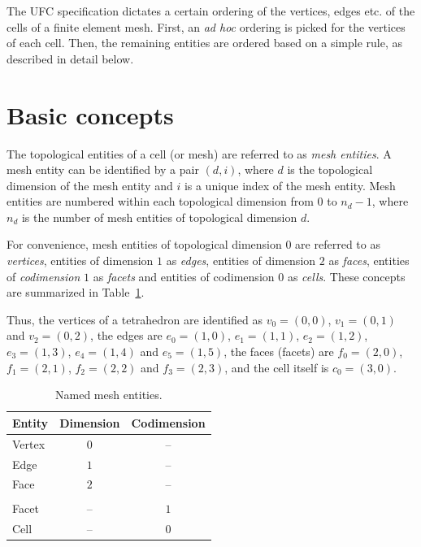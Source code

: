 
The UFC specification dictates a certain ordering of the vertices,
edges etc. of the cells of a finite element mesh. First, an \emph{ad
hoc} ordering is picked for the vertices of each cell. Then, the
remaining entities are ordered based on a simple rule, as described in
detail below.

\section{Basic concepts}

The topological entities of a cell (or mesh) are referred to as
\emph{mesh entities}. A mesh entity can be identified by a pair
$(d, i)$, where $d$ is the topological dimension of the mesh entity and $i$
is a unique index of the mesh entity. Mesh entities are numbered
within each topological dimension from $0$ to $n_d-1$, where $n_d$ is
the number of mesh entities of topological dimension $d$.

For convenience, mesh entities of topological dimension $0$ are
referred to as \emph{vertices}, entities of dimension $1$
as \emph{edges}, entities of dimension $2$ as \emph{faces}, entities of
\emph{codimension} $1$ as \emph{facets} and entities of codimension
$0$ as \emph{cells}. These concepts are summarized in
Table~\ref{tab:entities}.

Thus, the vertices of a tetrahedron are identified as
$v_0 = (0, 0)$, $v_1 = (0, 1)$ and $v_2 = (0, 2)$,
the edges are
$e_0 = (1, 0)$, $e_1 = (1, 1)$, $e_2 = (1, 2)$,
$e_3 = (1, 3)$, $e_4 = (1, 4)$ and $e_5 = (1, 5)$,
the faces (facets) are
$f_0 = (2, 0)$, $f_1 = (2, 1)$, $f_2 = (2, 2)$ and $f_3 = (2, 3)$,
and the cell itself is
$c_0 = (3, 0)$.

\begin{table}[H]
\linespread{1.2}\selectfont
  \begin{center}
    \begin{tabular}{|l|c|c|}
      \hline
      Entity & Dimension & Codimension \\
      \hline
      Vertex & $0$       & -- \\
      Edge   & $1$       & -- \\
      Face   & $2$       & -- \\
      & & \\
      Facet  & --      &  $1$ \\
      Cell   & --      &  $0$ \\
      \hline
    \end{tabular}
    \caption{Named mesh entities.}
    \label{tab:entities}
  \end{center}
\end{table}


